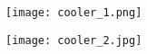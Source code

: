 {
\begin{minipage}{0.3\linewidth}
    \texttt{[image: cooler\_1.png]}
\end{minipage}
\hfill
\begin{minipage}{0.65\linewidth}
    \texttt{[image: cooler\_2.jpg]}
\end{minipage}
}

%


%
%
%
%
%
